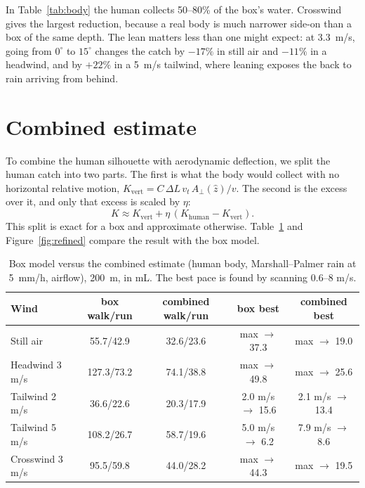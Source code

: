 \documentclass[11pt,a4paper]{article}
\begin{document}
In Table~\ref{tab:body} the human collects 50--80\% of the box's water. Crosswind gives the largest reduction, because a real body is much narrower side-on than a box of the same depth. The lean matters less than one might expect: at \SI{3.3}{m/s}, going from $0^\circ$ to $15^\circ$ changes the catch by $-17\%$ in still air and $-11\%$ in a headwind, and by $+22\%$ in a \SI{5}{m/s} tailwind, where leaning exposes the back to rain arriving from behind.

\section{Combined estimate}\label{sec:combined}
To combine the human silhouette with aerodynamic deflection, we split the human catch into two parts. The first is what the body would collect with no horizontal relative motion, $K_{\mathrm{vert}}=C\,\Delta L\,v_t\,A_\perp(\hat z)/v$. The second is the excess over it, and only that excess is scaled by $\eta$:
\begin{equation}
K\approx K_{\mathrm{vert}}+\eta\,(K_{\mathrm{human}}-K_{\mathrm{vert}}).
\end{equation}
This split is exact for a box and approximate otherwise. Table~\ref{tab:combined} and Figure~\ref{fig:refined} compare the result with the box model.

\begin{table}[h]\centering
\caption{Box model versus the combined estimate (human body, Marshall--Palmer rain at \SI{5}{mm/h}, airflow), \SI{200}{m}, in mL. The best pace is found by scanning 0.6--8 m/s.}\label{tab:combined}
\begin{tabular}{lcccc}\toprule
Wind & box walk/run & combined walk/run & box best & combined best\\\midrule
Still air & 55.7/42.9 & 32.6/23.6 & max $\to$ 37.3 & max $\to$ 19.0\\
Headwind 3 m/s & 127.3/73.2 & 74.1/38.8 & max $\to$ 49.8 & max $\to$ 25.6\\
Tailwind 2 m/s & 36.6/22.6 & 20.3/17.9 & 2.0 m/s $\to$ 15.6 & 2.1 m/s $\to$ 13.4\\
Tailwind 5 m/s & 108.2/26.7 & 58.7/19.6 & 5.0 m/s $\to$ 6.2 & 7.9 m/s $\to$ 8.6\\
Crosswind 3 m/s & 95.5/59.8 & 44.0/28.2 & max $\to$ 44.3 & max $\to$ 19.5\\\bottomrule
\end{tabular}
\end{table}
\end{document}
